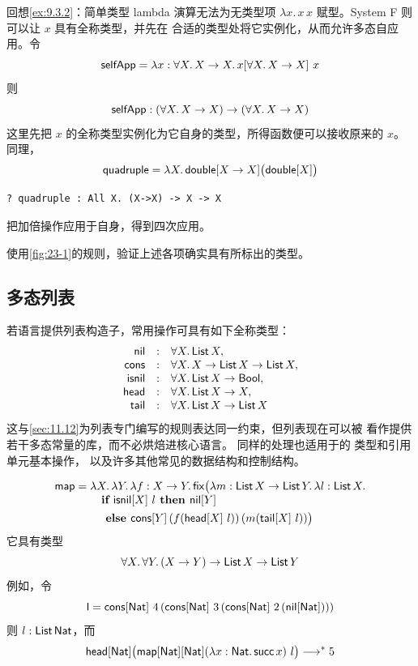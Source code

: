 回想\cref{ex:9.3.2}：简单类型 lambda 演算无法为无类型项
\(\lambda x.\,x\,x\) 赋型。System F 则可以让 \(x\) 具有全称类型，并先在
合适的类型处将它实例化，从而允许多态自应用。令
\[
\mathsf{selfApp}
=\lambda x:\forall X.\,X\to X.\,
   x[\forall X.\,X\to X]\ x
\]
则
\[
\mathsf{selfApp}:
(\forall X.\,X\to X)\to(\forall X.\,X\to X)
\]
这里先把 \(x\) 的全称类型实例化为它自身的类型，所得函数便可以接收原来的
\(x\)。同理，
\[
\mathsf{quadruple}
=\lambda X.\,
  \mathsf{double}[X\to X]\bigl(\mathsf{double}[X]\bigr)
\]
\begin{lstlisting}
? quadruple : All X. (X->X) -> X -> X
\end{lstlisting}
把加倍操作应用于自身，得到四次应用。

\begin{exercise}[\(\star\star\)]
\label{ex:23.4.1}
使用\cref{fig:23-1}的规则，验证上述各项确实具有所标出的类型。
\end{exercise}

\subsection*{多态列表}

若语言提供列表构造子，常用操作可具有如下全称类型：
\[
\begin{array}{rcl}
\mathsf{nil}&:&\forall X.\,\mathsf{List}\,X,\\
\mathsf{cons}&:&\forall X.\,X\to\mathsf{List}\,X\to\mathsf{List}\,X,\\
\mathsf{isnil}&:&\forall X.\,\mathsf{List}\,X\to\mathsf{Bool},\\
\mathsf{head}&:&\forall X.\,\mathsf{List}\,X\to X,\\
\mathsf{tail}&:&\forall X.\,\mathsf{List}\,X\to\mathsf{List}\,X
\end{array}
\]
这与\cref{sec:11.12}为列表专门编写的规则表达同一约束，但列表现在可以被
看作提供若干多态常量的库，而不必烘焙进核心语言。
同样的处理也适用于的  类型和引用单元基本操作，
以及许多其他常见的数据结构和控制结构。

\[
\begin{aligned}
\mathsf{map}={}&\lambda X.\,\lambda Y.\,
 \lambda f:X\to Y.\,
 \mathsf{fix}\bigl(
   \lambda m:\mathsf{List}\,X\to\mathsf{List}\,Y.\,
   \lambda l:\mathsf{List}\,X.\\[-1mm]
 &\quad\textbf{if }\mathsf{isnil}[X]\ l
   \textbf{ then }\mathsf{nil}[Y]\\
 &\quad\textbf{ else }\mathsf{cons}[Y]\,
      (f(\mathsf{head}[X]\ l))\,
      (m(\mathsf{tail}[X]\ l))\bigr)
\end{aligned}
\]
它具有类型
\[
\forall X.\,\forall Y.\,(X\to Y)\to\mathsf{List}\,X\to
\mathsf{List}\,Y
\]
例如，令
\[
\mathsf{l}=\mathsf{cons}[\mathsf{Nat}]\ 4\,
 (\mathsf{cons}[\mathsf{Nat}]\ 3\,
  (\mathsf{cons}[\mathsf{Nat}]\ 2\,
   (\mathsf{nil}[\mathsf{Nat}])))
\]
则 \(l:\mathsf{List}\,\mathsf{Nat}\)，而
\[
\mathsf{head}[\mathsf{Nat}]
 \bigl(\mathsf{map}[\mathsf{Nat}][\mathsf{Nat}]
 (\lambda x:\mathsf{Nat}.\,\mathsf{succ}\,x)\ l\bigr)
\longrightarrow^*5
\]

